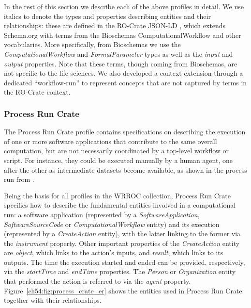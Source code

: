 In the rest of this section we describe each of the above profiles in detail.
We use italics to denote the types and properties describing entities and their relationships: these are defined in the RO-Crate JSON-LD , which extends Schema.org with terms from the Bioschemas \cite{Gray 2017} ComputationalWorkflow  and other vocabularies. More specifically, from Bioschemas we use the \emph{ComputationalWorkflow} and \emph{FormalParameter} types as well as the \emph{input} and \emph{output} properties. 
Note that these terms, though coming from Bioschemas, are not specific to the life sciences.
We also developed a context extension through a dedicated ``workflow-run''  to represent concepts that are not captured by terms in the RO-Crate context.

\subsubsection{Process Run Crate}\label{ch54:process-run-crate}

The Process Run Crate profile \cite{WRROC 2023a} contains specifications on describing the execution of one or more software applications that contribute to the same overall computation, but are not necessarily coordinated by a top-level workflow or script.
For instance, they could be executed manually by a human agent, one after the other as intermediate datasets become available, as shown in the process run  from \cite{Meurisse 2023}.

Being the basis for all profiles in the \acrshort{WRROC} collection, Process Run Crate specifies how to describe the fundamental entities involved in a computational run: a software application (represented by a
\emph{SoftwareApplication}, \emph{SoftwareSourceCode} or
\emph{ComputationalWorkflow} entity) and its execution (represented by a \emph{CreateAction} entity), with the latter linking to the former via the \emph{instrument} property.
Other important properties of the
\emph{CreateAction} entity are \emph{object}, which links to the action's inputs, and \emph{result}, which links to its outputs.
The time the execution started and ended can be provided, respectively, via the
\emph{startTime} and \emph{endTime} properties.
The \emph{Person} or
\emph{Organization} entity that performed the action is referred to via the \emph{agent} property.
Figure~\vref{ch54:fig:process_crate_er} shows the entities used in Process Run Crate together with their relationships.

